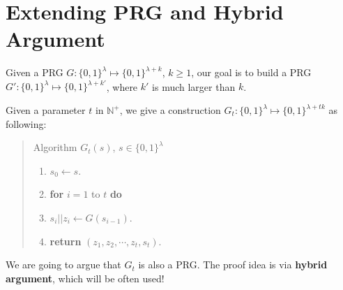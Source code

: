\documentclass[12pt]{article}
\newcommand{\N}{\mathbb{N}}
\newcommand{\bits}{\{0,1\}}
\newcommand{\tab}{\hspace{0.3in}}
\theoremstyle{definition}
\begin{document}
\section{Extending PRG and Hybrid Argument}
Given a PRG $G : \bits^\lambda \mapsto \bits^{\lambda+k}$, $k\geq 1$, our goal is to build a PRG $G' : \bits^\lambda \mapsto \bits^{\lambda+k'}$, where $k'$ is much larger than $k$.

Given a parameter $t$ in $\N^+$, we give a construction $G_t : \bits^\lambda \mapsto \bits^{\lambda+tk}$ as following:
\begin{quote}
Algorithm $G_t (s)$, $s\in\bits^\lambda$
\begin{enumerate}
\item $s_0 \gets s$.
\item {\bf for} $i=1$ to $t$ {\bf do}
\item \tab $s_i || z_i \gets G(s_{i-1})$.
\item {\bf return} $(z_1, z_2, \cdots, z_t, s_t)$.
\end{enumerate}
\end{quote}
We are going to argue that $G_t$ is also a PRG. The proof idea is via {\bf hybrid argument}, which will be often used!
\end{document}
